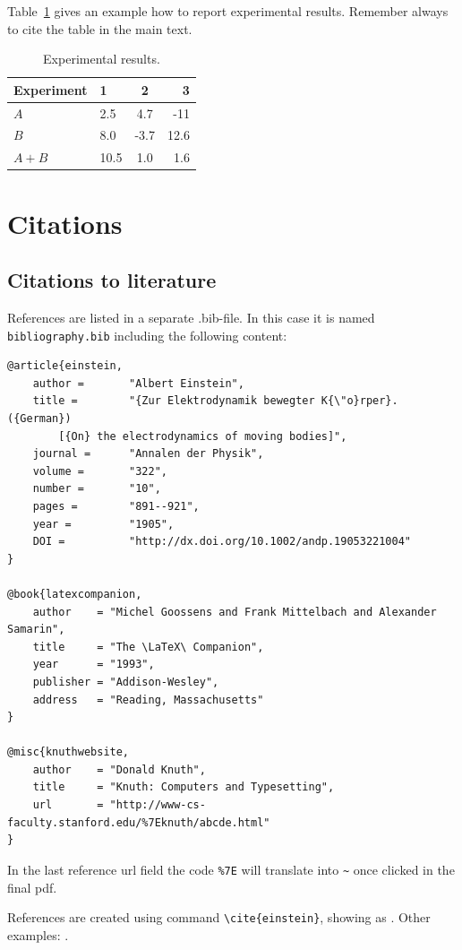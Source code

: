 Table~\ref{table:results} gives an example how to report experimental results. Remember always to cite the table in the main text. 

\begin{table}
\centering
\caption{Experimental results.\label{table:results}}
\begin{tabular}{l||l c r} 
Experiment & 1 & 2 & 3 \\ 
\hline \hline 
$A$ & 2.5 & 4.7 & -11 \\
$B$ & 8.0 & -3.7 & 12.6 \\
$A+B$ & 10.5 & 1.0 & 1.6 \\
\hline
%
\end{tabular}
\end{table}

\chapter{Citations}

\section{Citations to literature}

References are listed in a separate .bib-file. In this case it is named \texttt{bibliography.bib} including the following content:
\begin{verbatim}
@article{einstein,
    author =       "Albert Einstein",
    title =        "{Zur Elektrodynamik bewegter K{\"o}rper}. ({German})
        [{On} the electrodynamics of moving bodies]",
    journal =      "Annalen der Physik",
    volume =       "322",
    number =       "10",
    pages =        "891--921",
    year =         "1905",
    DOI =          "http://dx.doi.org/10.1002/andp.19053221004"
}
 
@book{latexcompanion,
    author    = "Michel Goossens and Frank Mittelbach and Alexander Samarin",
    title     = "The \LaTeX\ Companion",
    year      = "1993",
    publisher = "Addison-Wesley",
    address   = "Reading, Massachusetts"
}
 
@misc{knuthwebsite,
    author    = "Donald Knuth",
    title     = "Knuth: Computers and Typesetting",
    url       = "http://www-cs-faculty.stanford.edu/%7Eknuth/abcde.html"
}
\end{verbatim}

In the last reference url field the code \verb+%7E+ will translate into \verb+~+ once clicked in the final pdf.

References are created using command \texttt{\textbackslash cite\{einstein\}}, showing as \citep{einstein}. Other examples: \citep{latexcompanion,knuthwebsite}.

